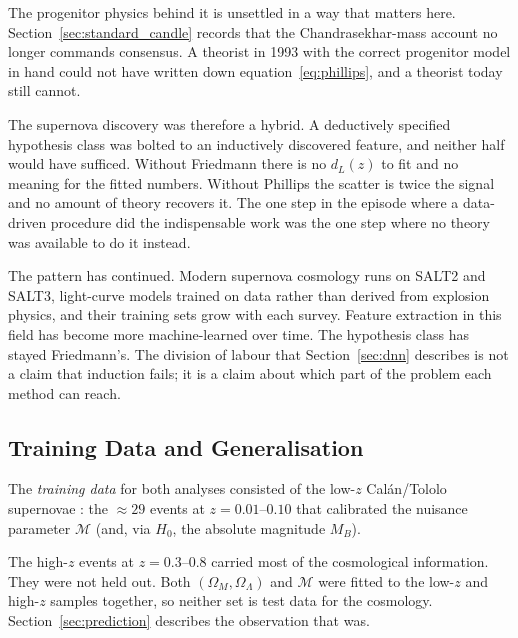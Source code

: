 \documentclass[12pt]{article}
\begin{document}
The progenitor physics behind it is unsettled in a way that matters here.
Section~\ref{sec:standard_candle} records that the Chandrasekhar-mass account
no longer commands consensus.  A theorist in 1993 with the correct progenitor
model in hand could not have written down equation~\eqref{eq:phillips}, and a
theorist today still cannot.

The supernova discovery was therefore a hybrid.  A deductively specified
hypothesis class was bolted to an inductively discovered feature, and neither
half would have sufficed.  Without Friedmann there is no $d_L(z)$ to fit and
no meaning for the fitted numbers.  Without Phillips the scatter is twice the
signal and no amount of theory recovers it.  The one step in the episode where
a data-driven procedure did the indispensable work was the one step where no
theory was available to do it instead.

The pattern has continued.  Modern supernova cosmology runs on SALT2 and
SALT3, light-curve models trained on data rather than derived from explosion
physics, and their training sets grow with each survey.  Feature extraction in
this field has become more machine-learned over time.  The hypothesis class
has stayed Friedmann's.  The division of labour that Section~\ref{sec:dnn}
describes is not a claim that induction fails; it is a claim about which part
of the problem each method can reach.

\subsection{Training Data and Generalisation}

The \emph{training data} for both analyses consisted of the low-$z$
Cal\'an/Tololo supernovae \citep{Hamuy1996}: the $\approx 29$ events
at $z = 0.01$--$0.10$ that calibrated the nuisance parameter
$\mathcal{M}$ (and, via $H_0$, the absolute magnitude $M_B$).

The high-$z$ events at $z = 0.3$--$0.8$ carried most of the cosmological
information.  They were not held out.  Both $(\Omega_M,\Omega_\Lambda)$ and
$\mathcal{M}$ were fitted to the low-$z$ and high-$z$ samples together, so
neither set is test data for the cosmology.  Section~\ref{sec:prediction}
describes the observation that was.
\end{document}
